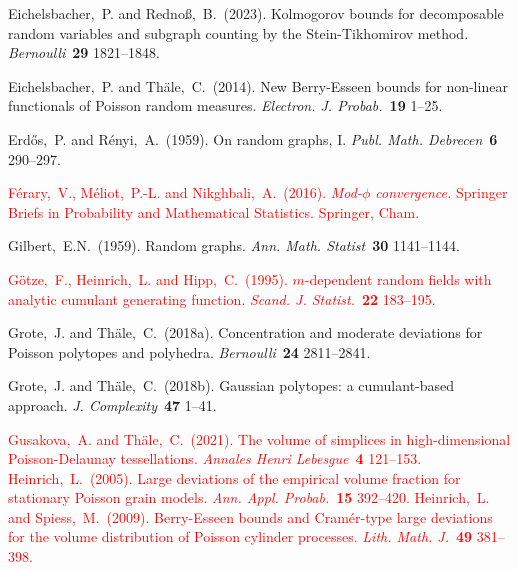 \documentclass[bj,authoryear,noshowframe]{imsart}
\theoremstyle{plain}
\theoremstyle{remark}
\let\Horig\H
\begin{document}
\begin{thebibliography}{4}
  Eichelsbacher,~P. and Redno{\ss},~B.~(2023).
  Kolmogorov bounds for decomposable random variables and subgraph counting by the Stein-Tikhomirov method. \textit{Bernoulli}~\textbf{29} 1821--1848. 

  Eichelsbacher,~P. and Th{\"a}le,~C.~(2014).
  New Berry-Esseen bounds for non-linear functionals of Poisson random measures.
  \textit{Electron. J. Probab.}~\textbf{19} 1--25.

  \bibitem[\protect\citeauthoryear {Erd{\Horig{o}}s and R\'enyi}{1959}]{ER}
Erd{\Horig{o}}s,~P. and R\'enyi,~A.~(1959).
  On random graphs, {I}.
  \textit{Publ. Math. Debrecen}~\textbf{6} 290--297.

  \textcolor{red}{
F\'erary,~V., M\'eliot,~P.-L. and Nikghbali,~A.~(2016). 
\textit{Mod-$\phi$ convergence.} 
Springer Briefs in Probability and Mathematical Statistics. Springer, Cham.
}

   Gilbert,~E.N.~(1959).
  Random graphs.
  \textit{Ann. Math. Statist}~\textbf{30} 1141--1144.

  \textcolor{red}{
G\"otze,~F., Heinrich,~L. and Hipp,~C.~(1995). $m$-dependent random fields with analytic cumulant generating function. 
\textit{Scand. J. Statist.}~\textbf{22} 183--195. 
}

  Grote,~J. and Th{\"a}le,~C.~(2018a).
  Concentration and moderate deviations for Poisson polytopes and polyhedra.
  \textit{Bernoulli}~\textbf{24} 2811--2841.

  Grote,~J. and Th{\"a}le,~C.~(2018b).
  Gaussian polytopes: a cumulant-based approach.
  \textit{J. Complexity}~\textbf{47} 1--41.

  \textcolor{red}{
  Gusakova,~A. and Th{\"a}le,~C.~(2021). 
  The volume of simplices in high-dimensional Poisson-Delaunay tessellations.
  \textit{Annales Henri Lebesgue}~\textbf{4} 121--153.  
Heinrich,~L.~(2005). 
Large deviations of the empirical volume fraction for stationary Poisson grain models. 
\textit{Ann. Appl. Probab.}~\textbf{15} 392--420.
Heinrich,~L. and Spiess,~M.~(2009). 
Berry-Esseen bounds and Cram\'er-type large deviations for the volume distribution of Poisson cylinder processes. 
\textit{Lith. Math. J.}~\textbf{49} 381--398.
}


\end{thebibliography}
\end{document}
